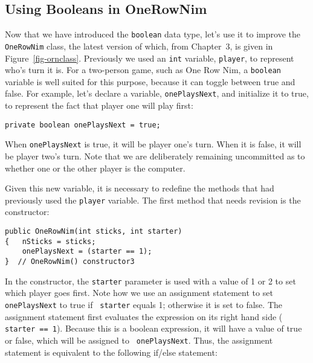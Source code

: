 
\subsection{Using Booleans in OneRowNim}
Now that we have introduced the {\tt boolean}
data type, let's use it to improve the {\tt OneRowNim} class, the
latest version of which, from Chapter~3, is given in
Figure~\ref{fig-ornclass}.  Previously we used an {\tt int} variable,
{\tt player}, to represent who's turn it is.  For a two-person game,
such as One Row Nim, a {\tt boolean} variable is well suited for this
purpose, because it can toggle between true and false. For example,
let's declare a variable, {\tt onePlaysNext}, and initialize it to
true, to represent the fact that player one will play first:

\begin{jjjlisting}
\begin{lstlisting}
private boolean onePlaysNext = true;
\end{lstlisting}
\end{jjjlisting}

\noindent When {\tt onePlaysNext} is true, it will be player one's
turn. When it is false, it will be player two's turn. Note that we are
deliberately remaining uncommitted as to whether one or the other
player is the computer.  

Given this new variable, it is necessary to redefine the methods that
had previously used the {\tt player} variable. The first method that
needs revision is the constructor:

\begin{jjjlisting}
\begin{lstlisting}
public OneRowNim(int sticks, int starter)
{   nSticks = sticks;
    onePlaysNext = (starter == 1);
}  // OneRowNim() constructor3
\end{lstlisting}
\end{jjjlisting}

\noindent In the constructor, the {\tt starter} parameter is used 
with a value of 1 or 2 to set which player goes first. Note how we use
an assignment statement to set {\tt onePlaysNext} to true if {\tt
starter} equals 1; otherwise it is set to false.  The assignment
statement first evaluates the expression on its right hand side ({\tt
starter == 1}). Because this is a boolean expression, it will have a
value of true or false, which will be assigned to {\tt
onePlaysNext}. Thus, the assignment statement is equivalent to the
following if/else statement:

